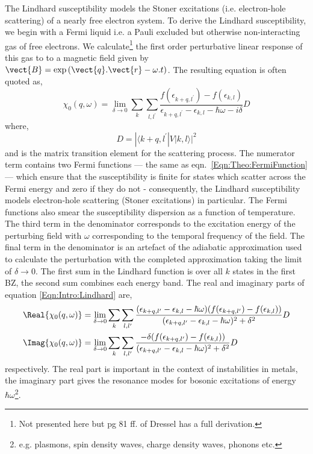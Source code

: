 The Lindhard susceptibility models the Stoner excitations (i.e. electron-hole scattering) of a nearly free electron system. To derive the Lindhard susceptibility, we begin with a Fermi liquid i.e. a Pauli excluded but otherwise non-interacting gas of free electrons. We calculate\footnote{Not presented here but pg 81 ff. of Dressel \cite{Dressel2002} has a full derivation.} the first order perturbative linear response of this gas to to a magnetic field given by $\vect{B}=\exp{(\vect{q}.\vect{r} - \omega.t})$. The resulting equation is often quoted as,
\begin{equation}
    \chi_0(q, \omega) = \lim_{\delta \to 0} \sum_{k}\sum_{l,l^\prime}\frac{f(\epsilon_{k+q,l^\prime}) - f(\epsilon_{k,l})}{\epsilon_{k+q,l^\prime} - \epsilon_{k,l} - \hbar\omega - i\delta}D
    \label{Eqn:Intro:Lindhard}
\end{equation}
where,
\begin{equation}
    D = |\langle k+q,l^\prime|V|k,l \rangle|^2
\end{equation}
and is the matrix transition element for the scattering process. The numerator term contains two Fermi functions --- the same as eqn.~\ref{Eqn:Theo:FermiFunction} --- which ensure that the susceptibility is finite for states which scatter across the Fermi energy and zero if they do not - consequently, the Lindhard susceptibility models electron-hole scattering (Stoner excitations) in particular. The Fermi functions also smear the susceptibility dispersion as a function of temperature. The third term in the denominator corresponds to the excitation energy of the perturbing field with $\omega$ corresponding to the temporal frequency of the field. The final term in the denominator is an artefact of the adiabatic approximation used to calculate the perturbation with the completed approximation taking the limit of $\delta \to 0$. The first sum in the Lindhard function is over all $k$ states in the first \ac{BZ}, the second sum combines each energy band. The real and imaginary parts of equation \ref{Eqn:Intro:Lindhard} are,
\begin{align}
\Real\{\chi_0(q, \omega)\} &= \lim_{\delta \to 0} \sum_{k}\sum_{l, l^\prime}\frac{(\epsilon_{k+q,l^\prime} - \epsilon_{k,l} - \hbar\omega) (f(\epsilon_{k+q,l^\prime}) - f(\epsilon_{k,l}))}{(\epsilon_{k+q,l^\prime} - \epsilon_{k,l} - \hbar\omega)^2 + \delta^2}D \\
\Imag\{\chi_0(q, \omega)\} &= \lim_{\delta \to 0} \sum_{k}\sum_{l, l^\prime}\frac{-\delta (f(\epsilon_{k+q,l^\prime}) - f(\epsilon_{k,l}))}{(\epsilon_{k+q,l^\prime} - \epsilon_{k,l} - \hbar\omega)^2 + \delta^2}D\\
\end{align}
respectively. The real part is important in the context of instabilities in metals, the imaginary part gives the resonance modes for bosonic excitations of energy $\hbar\omega$\footnote{e.g. plasmons, spin density waves, charge density waves, phonons etc.}.

